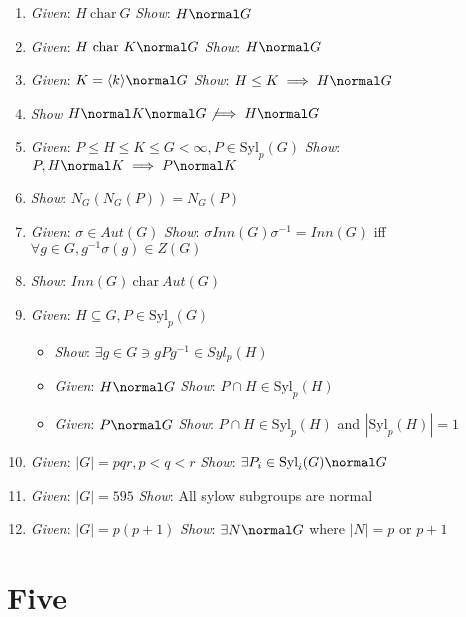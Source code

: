 \begin{enumerate}
\def\labelenumi{\arabic{enumi}.}
\item
  \emph{Given}: \(H~\text{char}~G\) \emph{Show}: \(H \normal G\)
\item
  \emph{Given}: \(H ~\text{char}~ K \normal G\) \emph{Show}:
  \(H \normal G\)
\item
  \emph{Given}: \(K = \langle k \rangle \normal G\) \emph{Show}:
  \(H \leq K \implies H \normal G\)
\item
  \emph{Show} \(H \normal K \normal G \not\implies H \normal G\)
\item
  \emph{Given}:
  \(P \leq H \leq K \leq G < \infty, P \in \text{Syl}_p(G)\)
  \emph{Show}: \(P, H \normal K \implies P \normal K\)
\item
  \emph{Show}: \(N_G(N_G(P)) = N_G(P)\)
\item
  \emph{Given}: \(\sigma \in Aut(G)\) \emph{Show}:
  \(\sigma Inn(G) \sigma^{-1} = Inn(G)\) iff
  \(\forall g\in G, g^{-1}\sigma(g)\in Z(G)\)
\item
  \emph{Show}: \(Inn(G) ~\text{char}~ Aut(G)\)
\item
  \emph{Given}: \(H \subseteq G, P \in \text{Syl}_p(G)\)

  \begin{itemize}
  \tightlist
  \item
    \emph{Show}: \(\exists g \in G \ni gPg^{-1} \in Syl_p(H)\)
  \item
    \emph{Given}: \(H \normal G\) \emph{Show}:
    \(P\cap H \in \text{Syl}_p(H)\)
  \item
    \emph{Given}: \(P \normal G\) \emph{Show}:
    \(P \cap H \in \text{Syl}_p(H)\) and \(|\text{Syl}_p(H)| = 1\)
  \end{itemize}
\item
  \emph{Given}: \(|G| = pqr, p < q < r\) \emph{Show}:
  \(\exists P_i \in \text{Syl}_i(G) \normal G\)
\item
  \emph{Given}: \(|G| =595\) \emph{Show}: All sylow subgroups are normal
\item
  \emph{Given}: \(|G| = p(p+1)\) \emph{Show}: \(\exists N \normal G\)
  where \(|N| = p\) or \(p+1\)
\end{enumerate}

\hypertarget{five}{%
\section{Five}\label{five}}

